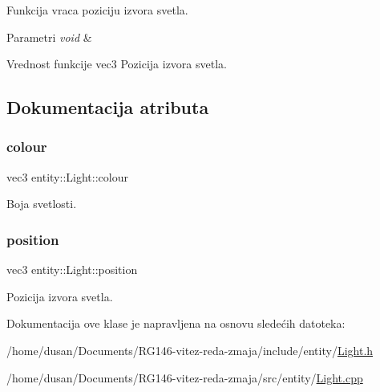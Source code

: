 Funkcija vraca poziciju izvora svetla. 


\begin{DoxyParams}{Parametri}
{\em void} & \\
\hline
\end{DoxyParams}
\begin{DoxyReturn}{Vrednost funkcije}
vec3 Pozicija izvora svetla. 
\end{DoxyReturn}


\subsection{Dokumentacija atributa}
\mbox{\label{classentity_1_1Light_a637c529cb886fb092ea0775b4821671d}} 
\subsubsection{\texorpdfstring{colour}{colour}}
{\footnotesize\ttfamily vec3 entity\+::\+Light\+::colour\hspace{0.3cm}{\ttfamily [private]}}



Boja svetlosti. 

\mbox{\label{classentity_1_1Light_a1c8e3d9bb8ba4f1c4e1c370cfa5ebe15}} 
\subsubsection{\texorpdfstring{position}{position}}
{\footnotesize\ttfamily vec3 entity\+::\+Light\+::position\hspace{0.3cm}{\ttfamily [private]}}



Pozicija izvora svetla. 



Dokumentacija ove klase je napravljena na osnovu sledećih datoteka\+:\begin{DoxyCompactItemize}
\item 
/home/dusan/\+Documents/\+R\+G146-\/vitez-\/reda-\/zmaja/include/entity/\hyperlink{Light_8h}{Light.\+h}\item 
/home/dusan/\+Documents/\+R\+G146-\/vitez-\/reda-\/zmaja/src/entity/\hyperlink{Light_8cpp}{Light.\+cpp}\end{DoxyCompactItemize}
